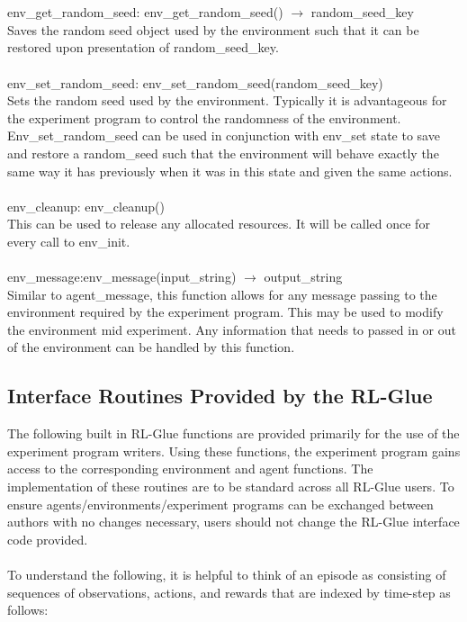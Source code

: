\documentclass[11pt]{article}
\begin{document}
\\\\
env\_get\_random\_seed: env\_get\_random\_seed() $\rightarrow$ random\_seed\_key\\
Saves the random seed object used by the environment such that it can be restored upon presentation of random\_seed\_key.
\\\\
env\_set\_random\_seed: env\_set\_random\_seed(random\_seed\_key)\\
Sets the random seed used by the environment. Typically it is advantageous for the experiment program to control the randomness of the environment. Env\_set\_random\_seed can be used in conjunction with env\_set state to save and restore a random\_seed such that the environment will behave exactly the same way it has previously when it was in this state and given the same actions.
\\\\                       
env\_cleanup: env\_cleanup()\\
This can be used to release any allocated resources. It will be called once for every call to env\_init.
\\\\
env\_message:env\_message(input\_string) $\rightarrow$ output\_string\\
Similar to agent\_message, this function allows for any message passing to the environment required by the experiment program. This may be used to modify the environment mid experiment. Any information that needs to passed in or out of the environment can be handled by this function.


\subsection{Interface Routines Provided by the RL-Glue}

The following built in RL-Glue functions are provided primarily for the use of the experiment program writers. Using these functions, the experiment program gains access to the corresponding environment and agent functions. The implementation of these routines are to be standard across all RL-Glue users. To ensure agents/environments/experiment programs can be exchanged between authors with no changes necessary, users should not change the RL-Glue interface code provided.
\\\\      
To understand the following, it is helpful to think of an episode as consisting of sequences of observations, actions, and rewards that are indexed by time-step as follows:
\end{document}
